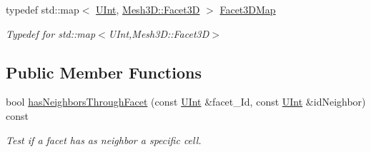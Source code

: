 \begin{DoxyCompactItemize}
typedef std\+::map$<$ \hyperlink{namespaceFVCode3D_a4bf7e328c75d0fd504050d040ebe9eda}{U\+Int}, \hyperlink{classFVCode3D_1_1Mesh3D_1_1Facet3D}{Mesh3\+D\+::\+Facet3D} $>$ \hyperlink{classFVCode3D_1_1Rigid__Mesh_ae579d78d6aa68fb20068061a01c71225}{Facet3\+D\+Map}
\begin{DoxyCompactList}\small\item\em Typedef for std\+::map$<$\+U\+Int,\+Mesh3\+D\+::\+Facet3\+D$>$ \end{DoxyCompactList}\end{DoxyCompactItemize}
\subsection*{Public Member Functions}
\begin{DoxyCompactItemize}
\item 
bool \hyperlink{classFVCode3D_1_1Rigid__Mesh_a816fca58143872612c89b46cb3bd01b3}{has\+Neighbors\+Through\+Facet} (const \hyperlink{namespaceFVCode3D_a4bf7e328c75d0fd504050d040ebe9eda}{U\+Int} \&facet\+\_\+\+Id, const \hyperlink{namespaceFVCode3D_a4bf7e328c75d0fd504050d040ebe9eda}{U\+Int} \&id\+Neighbor) const 
\begin{DoxyCompactList}\small\item\em Test if a facet has as neighbor a specific cell. \end{DoxyCompactList}\end{DoxyCompactItemize}
